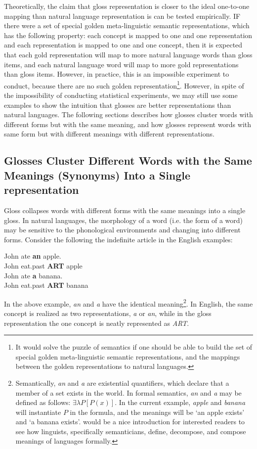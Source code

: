 \documentclass[final]{ua-thesis}
\numberwithin{equation}{section}
\begin{document}
Theoretically, the claim that gloss representation is closer to the ideal one-to-one mapping than natural language representation is can be tested empirically. IF there were a set of special golden meta-linguistic semantic representations, which has the following property: each concept is mapped to one and one representation and each representation is mapped to one and one concept, then it is expected that each gold representation will map to more natural language words than gloss items, and each natural language word will map to more gold representations than gloss items. However, in practice, this is an impossible experiment to conduct, because there are no such golden representation\footnote{It would solve the puzzle of semantics if one should be able to build the set of special golden meta-linguistic semantic representations, and the mappings between the golden representations to natural languages.}. However, in spite of the impossibility of conducting statistical experiments, we may still use some examples to show the intuition that glosses are better representations than natural languages. The following sections describes how glosses cluster words with different forms but with the same meaning, and how glosses represent words with same form but with different meanings with different representations. 

\subsection{Glosses Cluster Different Words with the Same Meanings (Synonyms) Into a Single representation}
Gloss collapses words with different forms with the same meanings into a single gloss. In natural languages, the morphology of a word (i.e. the form of a word) may be sensitive to the phonological environments and changing into different forms. Consider the following the indefinite article in the English examples: 

\begin{exe}  
\ex \gll John ate \textbf{an} apple.\\
	John eat.past	\textbf{ART} apple\\
\ex \gll John ate \textbf{a} banana.\\
	John eat.past   \textbf{ART} banana\\
\end{exe}

In the above example, \textit{an} and \textit{a} have the identical meaning\footnote{Semantically, \textit{an} and \textit{a} are existential quantifiers, which declare that a member of a set exists in the world. In formal semantics, \textit{an} and \textit{a} may be defined as follows: $\exists\lambda P[P(x)]$. In the current example, \textit{apple} and \textit{banana} will instantiate $P$ in the formula, and the meanings will be `an apple exists' and `a banana exists'. \citet{kratzer1998semantics} would be a nice introduction for interested readers to see how linguists, specifically semanticians, define, decompose, and compose meanings of languages formally.}. 
In English, the same concept is realized as two representations, \textit{a} or \textit{an}, while in the gloss representation the one concept is neatly represented as \textit{ART}. 
\end{document}
